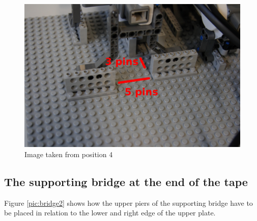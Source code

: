 \documentclass[%
  a4paper,%
  11pt,%
  blue,%
  hyperref	%
  ]{tubsartcl}
\begin{document}
\begin{figure}[!htb]
\begin{center}
\includegraphics[scale=0.3]{graphics_lego/position4.jpg}
\end{center}
\caption{Image taken from position 4}
\label{pic:position4}
\end{figure}

\clearpage

\subsection{The supporting bridge at the end of the tape}

Figure \ref{pic:bridge2} shows how the upper piers of the supporting bridge have to be placed in relation to the lower and right edge of the upper plate.
\end{document}
